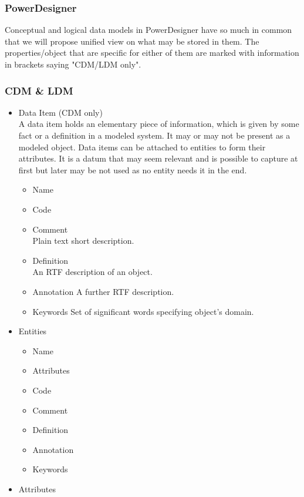 \subsubsection{PowerDesigner}

Conceptual and logical data models in PowerDesigner have so much in common that we will propose unified view on what may be stored in them. The properties/object that are specific for either of them are marked with information in brackets saying "CDM/LDM only".

\subsubsection{CDM \& LDM}

\begin{itemize}
	\item Data Item (CDM only) \\
	A data item holds an elementary piece of information, which is given by some fact or a definition in a modeled system. It may or may not be present as a modeled object. Data items can be attached to entities to form their attributes. It is a datum that may seem relevant and is possible to capture at first but later may be not used as no entity needs it in the end.
	\begin{itemize}
		\item Name
		\item Code
		\item Comment \\
		Plain text short description.
		\item Definition \\
		An RTF description of an object.
		\item Annotation
		A further RTF description.
		\item Keywords
		Set of significant words specifying object's domain.
	\end{itemize}
	\item Entities
	\begin{itemize}
		\item Name 
		\item Attributes
		\item Code 
		\item Comment
		\item Definition
		\item Annotation
		\item Keywords
	\end{itemize}
	\item Attributes

\end{itemize}
